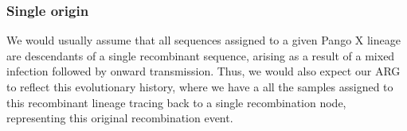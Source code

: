 \documentclass{article}
\begin{document}



\subsubsection{Single origin}

We would usually assume that all sequences assigned to a given Pango X
lineage are descendants of a single recombinant sequence, arising as a
result of a mixed infection followed by onward transmission. Thus, we
would also expect our ARG to reflect this evolutionary history, where
we have a all the samples assigned to this recombinant lineage tracing
back to a single recombination node, representing this original
recombination event.
\end{document}
